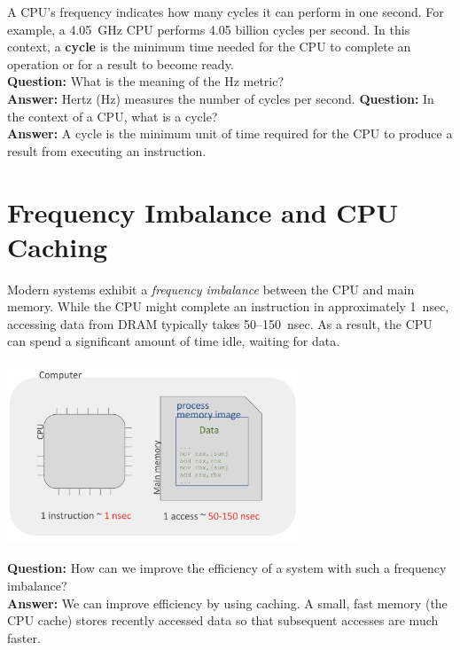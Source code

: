 \documentclass[../../compsys.tex]{subfiles}
\begin{document}
\begin{definition}
A CPU’s frequency indicates how many cycles it can perform in one second. For example, a 4.05~GHz CPU performs 4.05 billion cycles per second. In this context, a \textbf{cycle} is the minimum time needed for the CPU to complete an operation or for a result to become ready.\\
\vspace{0.5em}
{\textbf{Question:} What is the meaning of the Hz metric?}\\[0.5em]
\textbf{Answer:} Hertz (Hz) measures the number of cycles per second.
\vspace{0.5em}
{\textbf{Question:} In the context of a CPU, what is a cycle?}\\[0.5em]
\textbf{Answer:} A cycle is the minimum unit of time required for the CPU to produce a result from executing an instruction.
\end{definition}


\section{Frequency Imbalance and CPU Caching}

Modern systems exhibit a \emph{frequency imbalance} between the CPU and main memory. While the CPU might complete an instruction in approximately 1~nsec, accessing data from DRAM typically takes 50–150~nsec. As a result, the CPU can spend a significant amount of time idle, waiting for data.

\begin{center}
  \includegraphics[width=0.65\textwidth]{chapters/L1/images/imbalance.png}
\end{center}

\vspace{0.5em}
{\textbf{Question:} How can we improve the efficiency of a system with such a frequency imbalance?}\\[0.5em]
\textbf{Answer:} We can improve efficiency by using caching. A small, fast memory (the CPU cache) stores recently accessed data so that subsequent accesses are much faster.
\newpage
\end{document}
